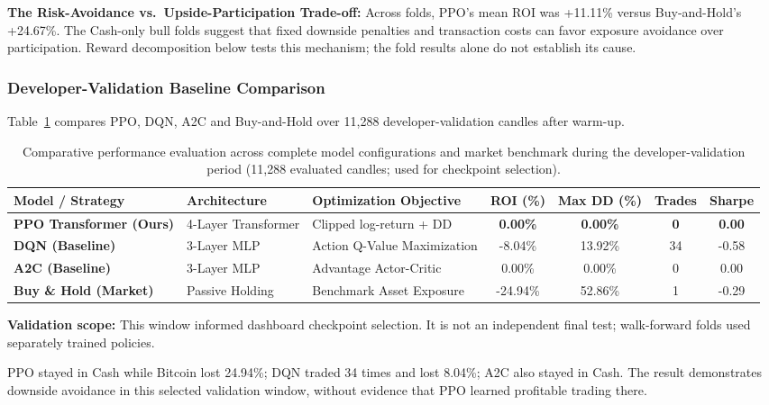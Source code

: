 \documentclass[11pt,a4paper]{article}
\begin{document}
\textbf{The Risk-Avoidance vs.\ Upside-Participation Trade-off:}
Across folds, PPO's mean ROI was +11.11\% versus Buy-and-Hold's +24.67\%. The Cash-only bull folds suggest that fixed downside penalties and transaction costs can favor exposure avoidance over participation. Reward decomposition below tests this mechanism; the fold results alone do not establish its cause.

\subsubsection{Developer-Validation Baseline Comparison}
Table~\ref{tab:baseline_comparison} compares PPO, DQN, A2C and Buy-and-Hold over 11,288 developer-validation candles after warm-up.

\begin{table}[H]
\centering
\footnotesize
\begin{tabularx}{\textwidth}{p{2.8cm} p{2.6cm} X c c c c}
\toprule
\textbf{Model / Strategy} & \textbf{Architecture} & \textbf{Optimization Objective} & \textbf{ROI (\%)} & \textbf{Max DD (\%)} & \textbf{Trades} & \textbf{Sharpe} \\
\midrule
\textbf{PPO Transformer (Ours)} & 4-Layer Transformer & Clipped log-return + DD & \textbf{0.00\%} & \textbf{0.00\%} & \textbf{0} & \textbf{0.00} \\
\textbf{DQN (Baseline)} & 3-Layer MLP & Action Q-Value Maximization & -8.04\% & 13.92\% & 34 & -0.58 \\
\textbf{A2C (Baseline)} & 3-Layer MLP & Advantage Actor-Critic & 0.00\% & 0.00\% & 0 & 0.00 \\
\textbf{Buy \& Hold (Market)} & Passive Holding & Benchmark Asset Exposure & -24.94\% & 52.86\% & 1 & -0.29 \\
\bottomrule
\end{tabularx}
\caption{Comparative performance evaluation across complete model configurations and market benchmark during the developer-validation period (11,288 evaluated candles; used for checkpoint selection).}
\label{tab:baseline_comparison}
\end{table}

\textbf{Validation scope:} This window informed dashboard checkpoint selection. It is not an independent final test; walk-forward folds used separately trained policies.

PPO stayed in Cash while Bitcoin lost 24.94\%; DQN traded 34 times and lost 8.04\%; A2C also stayed in Cash. The result demonstrates downside avoidance in this selected validation window, without evidence that PPO learned profitable trading there.
\end{document}
